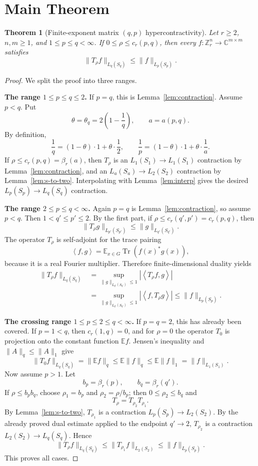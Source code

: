 \documentclass[11pt]{article}
\newtheorem{theorem}{Theorem}
\newcommand{\C}{\mathbb C}
\newcommand{\Z}{\mathbb Z}
\newcommand{\E}{\mathbb E}
\newcommand{\Tr}{\operatorname{Tr}}
\newcommand{\ip}[2]{\left\langle #1,#2\right\rangle}
\begin{document}
\section*{Main Theorem}

\begin{theorem}[Finite-exponent matrix $(q,p)$ hypercontractivity]
\label{thm:main}
Let $r\geq2$, $n,m\geq1$, and $1\leq p\leq q<\infty$. If
$0\leq\rho\leq c_r(p,q)$, then every $f:\Z_r^n\to\C^{m\times m}$ satisfies
\[
  \|T_\rho f\|_{L_q(S_q)}\leq \|f\|_{L_p(S_p)}.
\]
\end{theorem}

\begin{proof}
We split the proof into three ranges.

\smallskip
\noindent\textbf{The range $1\leq p\leq q\leq2$.}
If $p=q$, this is Lemma~\ref{lem:contraction}. Assume $p<q$. Put
\[
  \theta=\theta_q=2\left(1-\frac1q\right),\qquad
  a=a(p,q).
\]
By definition,
\[
  \frac1q=(1-\theta)\cdot1+\theta\cdot\frac12,
  \qquad
  \frac1p=(1-\theta)\cdot1+\theta\cdot\frac1a.
\]
If $\rho\leq c_r(p,q)=\beta_r(a)$, then $T_\rho$ is an
$L_1(S_1)\to L_1(S_1)$ contraction by Lemma~\ref{lem:contraction}, and an
$L_a(S_a)\to L_2(S_2)$ contraction by Lemma~\ref{lem:s-to-two}. Interpolating
with Lemma~\ref{lem:interp} gives the desired
$L_p(S_p)\to L_q(S_q)$ contraction.

\smallskip
\noindent\textbf{The range $2\leq p\leq q<\infty$.}
Again $p=q$ is Lemma~\ref{lem:contraction}, so assume $p<q$. Then
$1<q'\leq p'\leq2$. By the first part, if
$\rho\leq c_r(q',p')=c_r(p,q)$, then
\[
  \|T_\rho g\|_{L_{p'}(S_{p'})}
  \leq
  \|g\|_{L_{q'}(S_{q'})}.
\]
The operator $T_\rho$ is self-adjoint for the trace pairing
\[
  \ip{f}{g}=\E_{x\in G}\Tr(f(x)^*g(x)),
\]
because it is a real Fourier multiplier. Therefore finite-dimensional
duality yields
\[
\begin{aligned}
  \|T_\rho f\|_{L_q(S_q)}
  &=
  \sup_{\|g\|_{L_{q'}(S_{q'})}\leq1}
  |\ip{T_\rho f}{g}|  \\
  &=
  \sup_{\|g\|_{L_{q'}(S_{q'})}\leq1}
  |\ip{f}{T_\rho g}|
  \leq
  \|f\|_{L_p(S_p)} .
\end{aligned}
\]

\smallskip
\noindent\textbf{The crossing range $1\leq p\leq2\leq q<\infty$.}
If $p=q=2$, this has already been covered. If $p=1<q$, then
$c_r(1,q)=0$, and for $\rho=0$ the operator $T_0$ is projection onto the
constant function $\E f$. Jensen's inequality and
$\|A\|_q\leq\|A\|_1$ give
\[
  \|T_0f\|_{L_q(S_q)}=\|\E f\|_q\leq\E\|f\|_q\leq\E\|f\|_1
  =\|f\|_{L_1(S_1)}.
\]
Now assume $p>1$. Let
\[
  b_p=\beta_r(p),\qquad b_q=\beta_r(q').
\]
If $\rho\leq b_pb_q$, choose $\rho_1=b_p$ and $\rho_2=\rho/b_p$; then
$0\leq\rho_2\leq b_q$ and
\[
  T_\rho=T_{\rho_2}T_{\rho_1}.
\]
By Lemma~\ref{lem:s-to-two}, $T_{\rho_1}$ is a contraction
$L_p(S_p)\to L_2(S_2)$. By the already proved dual estimate applied to the
endpoint $q'\to2$, $T_{\rho_2}$ is a contraction
$L_2(S_2)\to L_q(S_q)$. Hence
\[
  \|T_\rho f\|_{L_q(S_q)}
  \leq
  \|T_{\rho_1}f\|_{L_2(S_2)}
  \leq
  \|f\|_{L_p(S_p)} .
\]
This proves all cases.
\end{proof}
\end{document}

